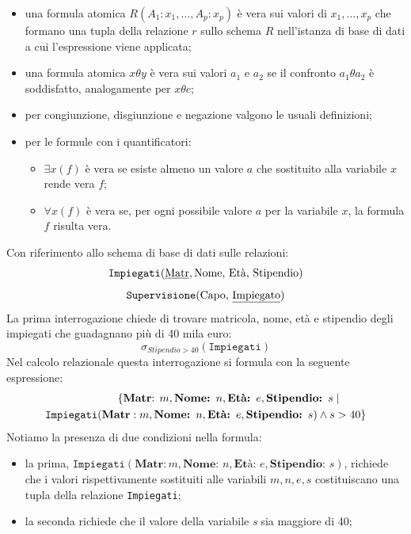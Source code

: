 \documentclass[12pt]{report}
\begin{document}
 	\begin{itemize}
 		\item una formula atomica $R(A_1: x_1, \dots, A_p: x_p)$ è vera sui valori di $x_1, \dots, x_p$ che formano una tupla della relazione $r$ sullo schema $R$ nell'istanza di base di dati a cui l'espressione viene applicata;
 		\item una formula atomica $x\theta y$ è vera sui valori $a_1$ e $a_2$ se il confronto $a_1 \theta a_2$ è soddisfatto, analogamente per $x \theta c$;
 		\item per congiunzione, disgiunzione e negazione valgono le usuali definizioni;
 		\item per le formule con i quantificatori:
 		\begin{itemize}
 			\item $\exists x(f)$ è vera se esiste almeno un valore $a$ che sostituito alla variabile $x$ rende vera $f$;
 			\item $\forall x(f)$ è vera se, per ogni possibile valore $a$ per la variabile $x$, la formula $f$ risulta vera.
 		\end{itemize}
 	\end{itemize}
 	Con riferimento allo schema di base di dati sulle relazioni:
 	\[
 	\texttt{Impiegati}(\text{\underline{Matr}}, \text{Nome, Età, Stipendio})
 	\]
 	\[
 	\texttt{Supervisione}(\text{Capo, \underline{Impiegato}})
 	\]
 	La prima interrogazione chiede di trovare matricola, nome, età e stipendio degli impiegati che guadagnano più di 40 mila euro:
 	\[
 	\sigma_{Stipendio > 40}(\texttt{Impiegati})
 	\]
 	Nel calcolo relazionale questa interrogazione si formula con la seguente espressione:
 	\begin{align*}
 		& \hspace{2.3cm}\{\text{\textbf{Matr}: }m, \textbf{Nome: } n, \textbf{Età: } e, \textbf{Stipendio: } s \mid  \\
 		&\texttt{Impiegati}(\textbf{Matr}: m, \textbf{Nome: } n, \textbf{Età: }e, \textbf{Stipendio: }s) \wedge s > 40\}
 	\end{align*}
 	Notiamo la presenza di due condizioni nella formula:
 	\begin{itemize}
 		\item la prima, $\texttt{Impiegati}(\textbf{Matr}: m, \textbf{Nome: } n, \textbf{Età: }e, \textbf{Stipendio: }s)$, richiede che i valori rispettivamente sostituiti alle variabili $m, n, e, s$ costituiscano una tupla della relazione \texttt{Impiegati};
 		\item la seconda richiede che il valore della variabile \textit{s} sia maggiore di 40;
 	\end{itemize}
\end{document}
